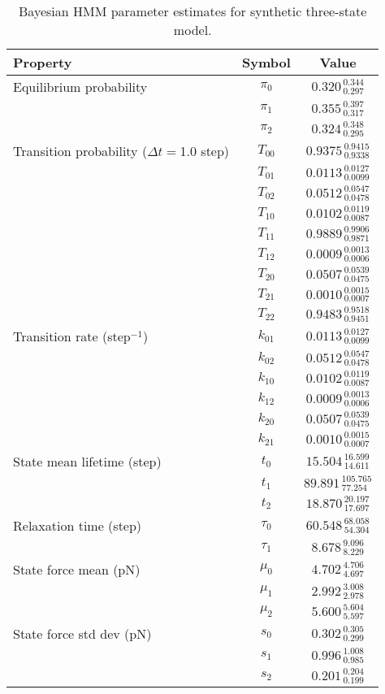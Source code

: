 
\begin{table}
    \begin{tabular*}{\columnwidth}{@{\extracolsep{\fill}}lcc}
        \hline
        {\bf Property} & {\bf Symbol} & {\bf Value} \\
        \hline
            		Equilibrium probability 		& $\pi_{0}$ & $0.320_{\:0.297}^{\:0.344}$ \\
		& $\pi_{1}$ & $0.355_{\:0.317}^{\:0.397}$ \\
		& $\pi_{2}$ & $0.324_{\:0.295}^{\:0.348}$ \\
		\hline
		Transition probability ($\Delta t = $1.0 step) 		& $T_{00}$ & $0.9375_{\:0.9338}^{\:0.9415}$ \\
		& $T_{01}$ & $0.0113_{\:0.0099}^{\:0.0127}$ \\
		& $T_{02}$ & $0.0512_{\:0.0478}^{\:0.0547}$ \\
		& $T_{10}$ & $0.0102_{\:0.0087}^{\:0.0119}$ \\
		& $T_{11}$ & $0.9889_{\:0.9871}^{\:0.9906}$ \\
		& $T_{12}$ & $0.0009_{\:0.0006}^{\:0.0013}$ \\
		& $T_{20}$ & $0.0507_{\:0.0475}^{\:0.0539}$ \\
		& $T_{21}$ & $0.0010_{\:0.0007}^{\:0.0015}$ \\
		& $T_{22}$ & $0.9483_{\:0.9451}^{\:0.9518}$ \\
		\hline
		Transition rate (step$^{-1}$) 		& $k_{01}$ & $0.0113_{\:0.0099}^{\:0.0127}$ \\
		& $k_{02}$ & $0.0512_{\:0.0478}^{\:0.0547}$ \\
		& $k_{10}$ & $0.0102_{\:0.0087}^{\:0.0119}$ \\
		& $k_{12}$ & $0.0009_{\:0.0006}^{\:0.0013}$ \\
		& $k_{20}$ & $0.0507_{\:0.0475}^{\:0.0539}$ \\
		& $k_{21}$ & $0.0010_{\:0.0007}^{\:0.0015}$ \\
		\hline
		State mean lifetime (step) 		& $t_{0}$ & $15.504_{\:14.611}^{\:16.599}$ \\
		& $t_{1}$ & $89.891_{\:77.254}^{\:105.765}$ \\
		& $t_{2}$ & $18.870_{\:17.697}^{\:20.197}$ \\
		\hline
		Relaxation time (step) 		& $\tau_{0}$ & $60.548_{\:54.304}^{\:68.058}$ \\
		& $\tau_{1}$ & $8.678_{\:8.229}^{\:9.096}$ \\
		\hline
		\hline
		State force mean (pN) 		& $\mu_{0}$ & $4.702_{\:4.697}^{\:4.706}$ \\
		& $\mu_{1}$ & $2.992_{\:2.978}^{\:3.008}$ \\
		& $\mu_{2}$ & $5.600_{\:5.597}^{\:5.604}$ \\
		\hline
		State force std dev (pN) 		& $s_{0}$ & $0.302_{\:0.299}^{\:0.305}$ \\
		& $s_{1}$ & $0.996_{\:0.985}^{\:1.008}$ \\
		& $s_{2}$ & $0.201_{\:0.199}^{\:0.204}$ \\
		\hline

        \hline
    \end{tabular*}
    \caption{Bayesian HMM parameter estimates for synthetic three-state model.}
\end{table}
            